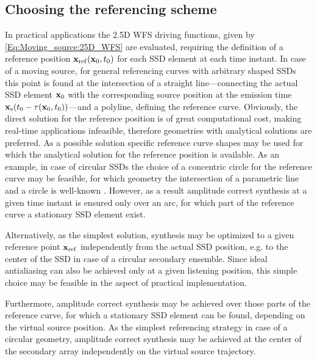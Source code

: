 \subsection{Choosing the referencing scheme}
In practical applications the 2.5D WFS driving functions, given by \eqref{Eq:Moving_source:25D_WFS} are evaluated, requiring the definition of a reference position $\mathbf{x}_{\mathrm{ref}}(\mathbf{x}_0,t_0)$ for each SSD element at each time instant.
In case of a moving source, for general referencing curves with arbitrary shaped SSDs this point is found at the intersection of a straight line---connecting the actual SSD element $\mathbf{x}_0$ with the corresponding source position at the emission time $\mathbf{x}_{\mathrm{s}}(t_0-\tau(\mathbf{x}_0,t_0))$---and a polyline, defining the reference curve. 
Obviously, the direct solution for the reference position is of great computational cost, making real-time applications infeasible, therefore geometries with analytical solutions are preferred.
As a possible solution specific reference curve shapes may be used for which the analytical solution for the reference position is available.
As an example, in case of circular SSDs the choice of a concentric circle for the reference curve may be feasible, for which geometry the intersection of a parametric line and a circle is well-known \cite[Ch.7.3.2]{Schneider2003:ComputerGraphics}.
However, as a result amplitude correct synthesis at a given time instant is ensured only over an arc, for which part of the reference curve a stationary SSD element exist.

Alternatively, as the simplest solution, synthesis may be optimized to a given reference point $\mathbf{x}_{\mathrm{ref}}$ independently from the actual SSD position, e.g. to the center of the SSD in case of a circular secondary ensemble.
Since ideal antialiasing can also be achieved only at a given listening position, this simple choice may be feasible in the aspect of practical implementation.

Furthermore, amplitude correct synthesis may be achieved over those parts of the reference curve, for which a stationary SSD element can be found, depending on the virtual source position.
As the simplest referencing strategy in case of a circular geometry, amplitude correct synthesis may be achieved at the center of the secondary array independently on the virtual source trajectory.


